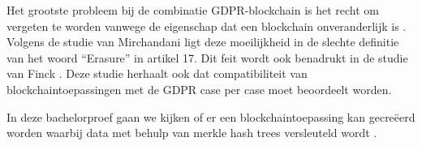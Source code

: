 Het grootste probleem bij de combinatie GDPR-blockchain is het recht om vergeten te worden vanwege de eigenschap dat een blockchain onveranderlijk is \autocite{Pilkington2016}. Volgens de studie van Mirchandani \autocite{Mirchandani2019} ligt deze moeilijkheid in de slechte definitie van het woord ``Erasure'' in artikel 17. Dit feit wordt ook benadrukt in de studie van Finck \autocite{Finck2019}. Deze studie herhaalt ook dat compatibiliteit van blockchaintoepassingen met de GDPR case per case moet beoordeelt worden.

In deze bachelorproef gaan we kijken of er een blockchaintoepassing kan gecreëerd worden waarbij data met behulp van merkle hash trees versleuteld wordt \autocite{Niaz2015}.




